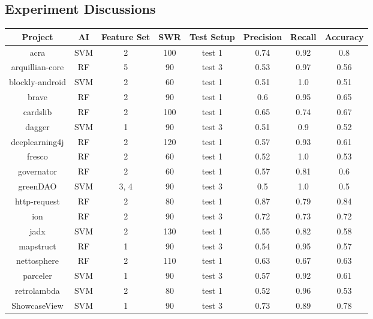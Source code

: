 \subsection{Experiment Discussions}


\begin{table}
\begin{center}
    \begin{tabular}{|c|c|c|c|c|c|c|c|}
        \hline
        Project & AI & Feature Set & SWR & Test Setup & Precision & Recall & Accuracy \\
        \hline
        acra & SVM & 2 & 100 & test 1 & 0.74 & 0.92 & 0.8 \\
        arquillian-core & RF & 5 & 90 & test 3 & 0.53 & 0.97 & 0.56 \\
        blockly-android & SVM & 2 & 60 & test 1 & 0.51 & 1.0 & 0.51 \\
        brave & RF & 2 & 90 & test 1 & 0.6 & 0.95 & 0.65 \\
        cardslib & RF & 2 & 100 & test 1 & 0.65 & 0.74 & 0.67 \\
        dagger & SVM & 1 & 90 & test 3 & 0.51 & 0.9 & 0.52 \\
        deeplearning4j & RF & 2 & 120 & test 1 & 0.57 & 0.93 & 0.61 \\
        fresco & RF & 2 & 60 & test 1 & 0.52 & 1.0 & 0.53 \\
        governator & RF & 2 & 60 & test 1 & 0.57 & 0.81 & 0.6 \\
        greenDAO & SVM & 3, 4 & 90 & test 3 & 0.5 & 1.0 & 0.5 \\
        http-request & RF & 2 & 80 & test 1 & 0.87 & 0.79 & 0.84 \\
        ion & RF & 2 & 90 & test 3 & 0.72 & 0.73 & 0.72 \\
        jadx & SVM & 2 & 130 & test 1 & 0.55 & 0.82 & 0.58 \\
        mapstruct & RF & 1 & 90 & test 3 & 0.54 & 0.95 & 0.57 \\
        nettosphere & RF & 2 & 110 & test 1 & 0.63 & 0.67 & 0.63 \\
        parceler & SVM & 1 & 90 & test 3 & 0.57 & 0.92 & 0.61 \\
        retrolambda & SVM & 2 & 80 & test 1 & 0.52 & 0.96 & 0.53 \\
        ShowcaseView & SVM & 1 & 90 & test 3 & 0.73 & 0.89 & 0.78 \\

\end{tabular}
\end{center}
\end{table}
